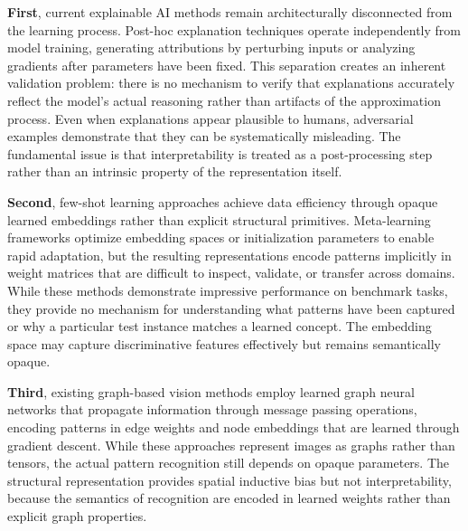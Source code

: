\documentclass[a4paper,10pt]{article}
\begin{document}
\textbf{First}, current explainable AI methods remain architecturally disconnected from the learning process. Post-hoc explanation techniques operate independently from model training, generating attributions by perturbing inputs or analyzing gradients after parameters have been fixed. This separation creates an inherent validation problem: there is no mechanism to verify that explanations accurately reflect the model's actual reasoning rather than artifacts of the approximation process. Even when explanations appear plausible to humans, adversarial examples demonstrate that they can be systematically misleading. The fundamental issue is that interpretability is treated as a post-processing step rather than an intrinsic property of the representation itself.

\textbf{Second}, few-shot learning approaches achieve data efficiency through opaque learned embeddings rather than explicit structural primitives. Meta-learning frameworks optimize embedding spaces or initialization parameters to enable rapid adaptation, but the resulting representations encode patterns implicitly in weight matrices that are difficult to inspect, validate, or transfer across domains. While these methods demonstrate impressive performance on benchmark tasks, they provide no mechanism for understanding what patterns have been captured or why a particular test instance matches a learned concept. The embedding space may capture discriminative features effectively but remains semantically opaque.

\textbf{Third}, existing graph-based vision methods employ learned graph neural networks that propagate information through message passing operations, encoding patterns in edge weights and node embeddings that are learned through gradient descent. While these approaches represent images as graphs rather than tensors, the actual pattern recognition still depends on opaque parameters. The structural representation provides spatial inductive bias but not interpretability, because the semantics of recognition are encoded in learned weights rather than explicit graph properties.
\end{document}
